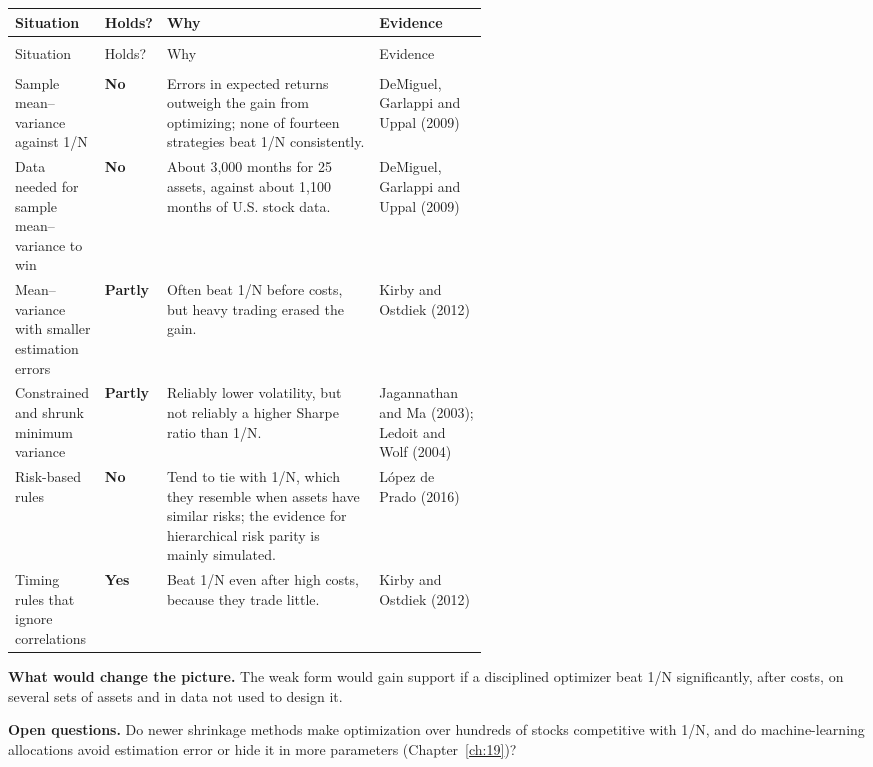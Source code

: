 {\small
\begin{longtable}{@{}>{\raggedright\arraybackslash}p{0.19\linewidth}>{\raggedright\arraybackslash}p{0.13\linewidth}>{\raggedright\arraybackslash}p{}>{\raggedright\arraybackslash}p{0.23\linewidth}@{}}
\toprule
Situation & Holds? & Why & Evidence \\
\midrule
\endfirsthead
\multicolumn{4}{@{}l}{\emph{(continued)}} \\
\toprule
Situation & Holds? & Why & Evidence \\
\midrule
\endhead
\midrule
\multicolumn{4}{r@{}}{\emph{(continued on the next page)}} \\
\endfoot
\bottomrule
\endlastfoot
Sample mean--variance against 1/N & \textbf{No} & Errors in expected returns outweigh the gain from optimizing; none of fourteen strategies beat 1/N consistently. & DeMiguel, Garlappi and Uppal (2009) \\*
\addlinespace[3pt]
Data needed for sample mean--variance to win & \textbf{No} & About 3,000 months for 25 assets, against about 1,100 months of U.S. stock data. & DeMiguel, Garlappi and Uppal (2009) \\
\addlinespace[3pt]
Mean--variance with smaller estimation errors & \textbf{Partly} & Often beat 1/N before costs, but heavy trading erased the gain. & Kirby and Ostdiek (2012) \\
\addlinespace[3pt]
Constrained and shrunk minimum variance & \textbf{Partly} & Reliably lower volatility, but not reliably a higher Sharpe ratio than 1/N. & Jagannathan and Ma (2003); Ledoit and Wolf (2004) \\
\addlinespace[3pt]
Risk-based rules & \textbf{No} & Tend to tie with 1/N, which they resemble when assets have similar risks; the evidence for hierarchical risk parity is mainly simulated. & L\'opez de Prado (2016) \\*
\addlinespace[3pt]
Timing rules that ignore correlations & \textbf{Yes} & Beat 1/N even after high costs, because they trade little. & Kirby and Ostdiek (2012) \\
\end{longtable}
\addtocounter{table}{-1}%
}

\textbf{What would change the picture.} The weak form would gain support if a disciplined optimizer beat 1/N significantly, after costs, on several sets of assets and in data not used to design it.

\label{sec:12-open}
\textbf{Open questions.} Do newer shrinkage methods make optimization over hundreds of stocks competitive with 1/N, and do machine-learning allocations avoid estimation error or hide it in more parameters (Chapter~\ref{ch:19})?

